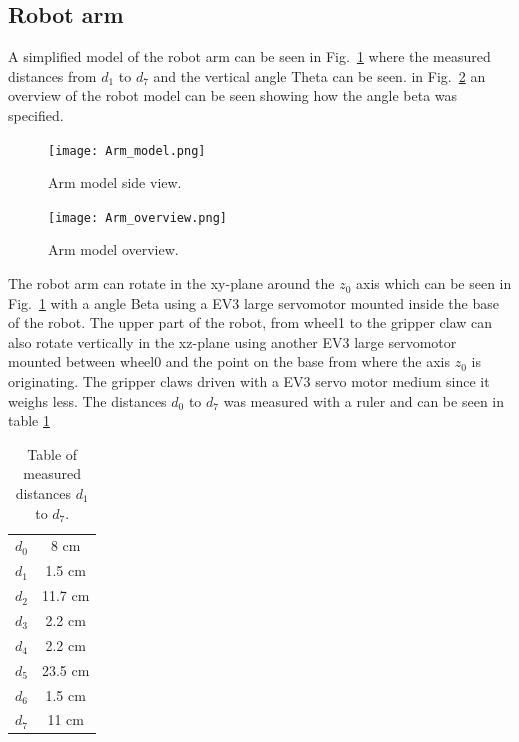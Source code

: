 \subsection{Robot arm}
A simplified model of the robot arm can be seen in Fig.~\ref{Arm_model} where the measured distances from \(d_1\) to \(d_7\) and the vertical angle Theta can be seen. in Fig.~\ref{arm_overview} an overview of the robot model can be seen showing how the angle beta was specified.
\begin{figure}[H]
    \centering
    \texttt{[image: Arm\_model.png]}
    \caption{Arm model side view.}
    \label{Arm_model}
\end{figure}
\begin{figure}[H]
    \centering
    \texttt{[image: Arm\_overview.png]}
    \caption{Arm model overview.}
    \label{arm_overview}
\end{figure}
The robot arm can rotate in the xy-plane around the \(z_0\) axis which can be seen in Fig.~\ref{Arm_model} with a angle Beta using a EV3 large servomotor mounted inside the base of the robot. The upper part of the robot, from wheel1 to the gripper claw can also rotate vertically in the xz-plane using another EV3 large servomotor mounted between wheel0 and the point on the base from where the axis \(z_0\) is originating. The gripper claws  driven with a EV3 servo motor medium since it weighs less. The distances \(d_0\) to \(d_7\) was measured with a ruler and can be seen in table \ref{Tab:distance_table}
\begin{table}[H]
\begin{center}
\begin{tabular}{ |c|c| } 
 \hline
 \(d_0\) & 8 cm  \\ 
 \(d_1\) & 1.5 cm  \\ 
 \(d_2\) & 11.7 cm  \\
 \(d_3\) & 2.2 cm\\
 \(d_4\) & 2.2 cm\\
 \(d_5\) & 23.5 cm\\
 \(d_6\) & 1.5 cm\\
 \(d_7\) & 11 cm \\
 \hline
\end{tabular}
\end{center}
\caption{Table of measured distances \(d_1\) to \(d_7\).}
\label{Tab:distance_table}
\end{table}
